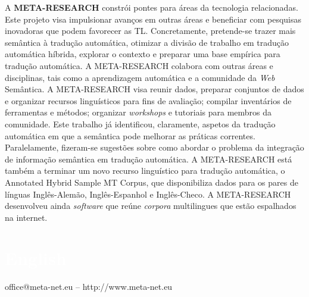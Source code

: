 \begin{multicols}{2}
A   \textbf{META-RESEARCH} constrói pontes para áreas da tecnologia relacionadas. Este projeto visa impulsionar avanços em outras áreas e beneficiar com pesquisas inovadoras que podem favorecer as TL. Concretamente, pretende-se trazer mais semântica à tradução automática, otimizar a divisão de trabalho em tradução automática híbrida, explorar o contexto e preparar uma base empírica para tradução automática. A META-RESEARCH colabora com outras áreas e disciplinas, tais como a aprendizagem automática e a comunidade da \textit{Web} Semântica. A META-RESEARCH visa reunir dados, preparar conjuntos de dados e organizar recursos linguísticos para fins de avaliação; compilar inventários de ferramentas e métodos; organizar \textit{workshops} e tutoriais para membros da comunidade. Este trabalho já identificou, claramente, aspetos da tradução automática em que a semântica pode melhorar as práticas correntes. Paralelamente, fizeram-se sugestões sobre como abordar o problema da integração de informação semântica em tradução automática. A META-RESEARCH está também a terminar um novo recurso linguístico para tradução automática, o Annotated Hybrid Sample MT Corpus, que disponibiliza dados para os pares de línguas Inglês-Alemão, Inglês-Espanhol e Inglês-Checo. A META-RESEARCH desenvolveu ainda \textit{software} que reúne \textit{corpora} multilingues que estão espalhados na internet.
\end{multicols}

\vfill

\makeatletter
{}
{
  \renewcommand*{\theHsection}{\thepart.\thesection}
}
\makeatother
\part*{\textcolor{white}{English}}
\setcounter{section}{0}
\setcounter{figure}{0}

\centerline{office@meta-net.eu -- http://www.meta-net.eu}


\cleardoublepage



